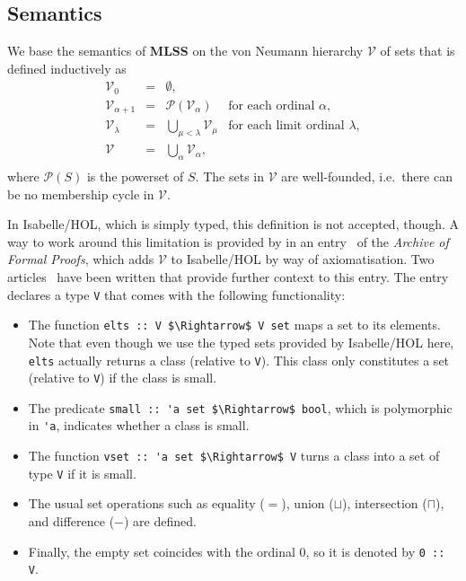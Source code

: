 \documentclass[
  sigplan,
  10pt,
  ]{acmart}
\newcommand{\MLSS}{\textbf{MLSS}}
\begin{document}
\subsection{Semantics}
We base the semantics of \MLSS{} on the von Neumann hierarchy $\mathcal{V}$ of sets that is defined inductively as
  \[
    \begin{array}{rclr}
      \mathcal{V}_0 & = & \emptyset, \\
      \mathcal{V}_{\alpha + 1} & = & \mathcal{P}(\mathcal{V}_\alpha) & \text{for each ordinal $\alpha$}, \\
      \mathcal{V}_{\lambda} & = & \bigcup_{\mu < \lambda} \mathcal{V}_\mu & \text{for each limit ordinal $\lambda$}, \\
      \mathcal{V} & = & \bigcup_\alpha \mathcal{V}_\alpha, \\
    \end{array}
  \]
where $\mathcal{P}(S)$ is the powerset of $S$.
The sets in $\mathcal{V}$ are well-founded, i.e.\ there can be no membership cycle in $\mathcal{V}$.

In Isabelle/HOL, which is simply typed, this definition is not accepted, though.
A way to work around this limitation is provided by \citeauthor{zfc_in_hol_afp} in an entry~\cite{zfc_in_hol_afp} of the \textit{Archive of Formal Proofs}, which adds $\mathcal{V}$ to Isabelle/HOL by way of axiomatisation.
Two articles~\cite{zfc_in_hol1,zfc_in_hol2} have been written that provide further context to this entry.
The entry declares a type \lstinline!V! that comes with the following functionality:
\begin{itemize}
  \item The function \lstinline!elts :: V $\Rightarrow$ V set! maps a set to its elements.
      Note that even though we use the typed sets provided by Isabelle/HOL here, \lstinline!elts! actually returns a class (relative to \lstinline!V!).
      This class only constitutes a set (relative to \lstinline!V!) if the class is small.
  \item The predicate \lstinline!small :: 'a set $\Rightarrow$ bool!, which is polymorphic in \lstinline!'a!, indicates whether a class is small.
  \item The function \lstinline!vset :: 'a set $\Rightarrow$ V! turns a class into a set of type \lstinline!V! if it is small. 
\item The usual set operations such as equality ($=$), union ($\sqcup$), intersection ($\sqcap$), and difference ($-$) are defined.
\item Finally, the empty set coincides with the ordinal $0$, so it is denoted by \lstinline!0 :: V!.
\end{itemize}
\end{document}
